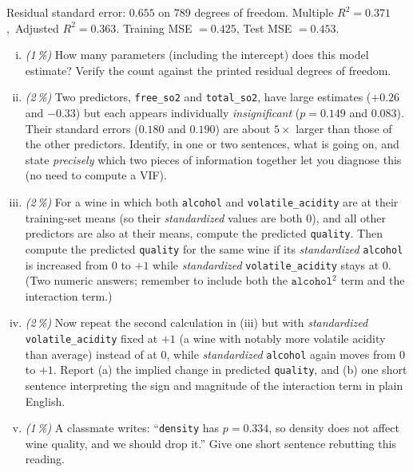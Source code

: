 \documentclass[11pt,a4paper]{article}
\newcommand{\subpoints}[1]{\textit{(#1\,\%)}}
\begin{document}
\noindent Residual standard error: $0.655$ on $789$ degrees of freedom.\quad
Multiple $R^2 = 0.371$,\ Adjusted $R^2 = 0.363$. Training MSE $= 0.425$, \quad Test MSE $= 0.453$.

\begin{enumerate}[(i)]
  \item \subpoints{1} How many parameters (including the intercept) does this model estimate? Verify the count against the printed residual degrees of freedom.

  \item \subpoints{2} Two predictors, \texttt{free\_so2} and \texttt{total\_so2}, have large estimates ($+0.26$ and $-0.33$) but each appears individually \emph{insignificant} ($p = 0.149$ and $0.083$). Their standard errors ($0.180$ and $0.190$) are about $5\times$ larger than those of the other predictors. Identify, in one or two sentences, what is going on, and state \emph{precisely} which two pieces of information together let you diagnose this (no need to compute a VIF).

  \item \subpoints{2} For a wine in which both \texttt{alcohol} and \texttt{volatile\_acidity} are at their training-set means (so their \emph{standardized} values are both $0$), and all other predictors are also at their means, compute the predicted \texttt{quality}. Then compute the predicted \texttt{quality} for the same wine if its \emph{standardized} \texttt{alcohol} is increased from $0$ to $+1$ while \emph{standardized} \texttt{volatile\_acidity} stays at $0$. (Two numeric answers; remember to include both the $\texttt{alcohol}^2$ term and the interaction term.)

  \item \subpoints{2} Now repeat the second calculation in (iii) but with \emph{standardized} \texttt{volatile\_acidity} fixed at $+1$ (a wine with notably more volatile acidity than average) instead of at $0$, while \emph{standardized} \texttt{alcohol} again moves from $0$ to $+1$. Report (a) the implied change in predicted \texttt{quality}, and (b) one short sentence interpreting the sign and magnitude of the interaction term in plain English.

  \item \subpoints{1} A classmate writes: ``\texttt{density} has $p = 0.334$, so density does not affect wine quality, and we should drop it.'' Give one short sentence rebutting this reading.
\end{enumerate}
\end{document}
